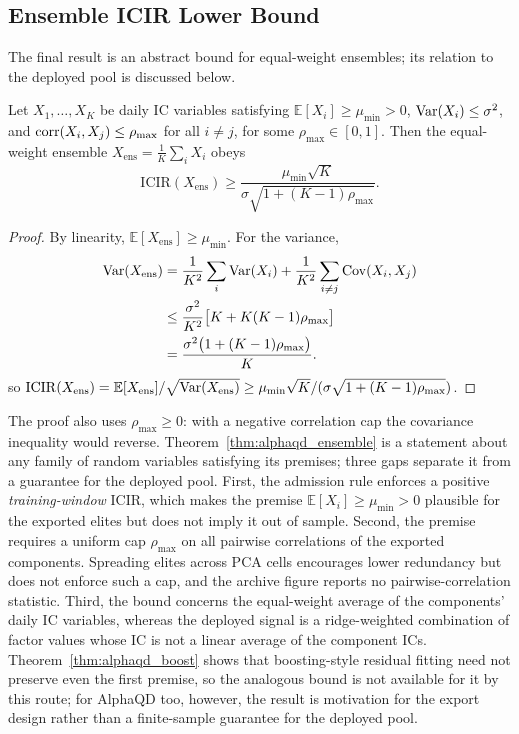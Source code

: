 \subsection{Ensemble ICIR Lower Bound}
\label{sec:alphaqd_ensemble}

The final result is an abstract bound for equal-weight ensembles; its relation to the deployed pool is discussed below.

\begin{theorem}
\label{thm:alphaqd_ensemble}
Let $X_1,\dots,X_K$ be daily IC variables satisfying $\mathbb{E}[X_i]\ge\mu_{\min}>0$, $\operatorname{Var}(X_i)\le\sigma^2$, and $\operatorname{corr}(X_i,X_j)\le\rho_{\max}$ for all $i\ne j$, for some $\rho_{\max}\in[0,1]$. Then the equal-weight ensemble $X_{\mathrm{ens}}=\frac{1}{K}\sum_i X_i$ obeys
\begin{equation}
\label{eq:alphaqd_ensemble}
\mathrm{ICIR}(X_{\mathrm{ens}}) \ge \frac{\mu_{\min}\sqrt{K}}{\sigma\sqrt{1+(K-1)\rho_{\max}}}.
\end{equation}
\end{theorem}
\begin{proof}
By linearity, $\mathbb{E}[X_{\mathrm{ens}}]\ge\mu_{\min}$. For the variance,
\begin{align*}
\operatorname{Var}(X_{\mathrm{ens}})
&=\frac{1}{K^2}\sum_i\operatorname{Var}(X_i)
  +\frac{1}{K^2}\sum_{i\ne j}\operatorname{Cov}(X_i,X_j)\\
&\le\frac{\sigma^2}{K^2}\bigl[K+K(K-1)\rho_{\max}\bigr]\\
&=\frac{\sigma^2\bigl(1+(K-1)\rho_{\max}\bigr)}{K}.
\end{align*}
so $\mathrm{ICIR}(X_{\mathrm{ens}})=\mathbb{E}[X_{\mathrm{ens}}]/\sqrt{\operatorname{Var}(X_{\mathrm{ens}})}\ge\mu_{\min}\sqrt{K}/(\sigma\sqrt{1+(K-1)\rho_{\max}})$.
\end{proof}

The proof also uses $\rho_{\max}\ge 0$: with a negative correlation cap the covariance inequality would reverse. Theorem~\ref{thm:alphaqd_ensemble} is a statement about any family of random variables satisfying its premises; three gaps separate it from a guarantee for the deployed pool. First, the admission rule enforces a positive \emph{training-window} ICIR, which makes the premise $\mathbb{E}[X_i]\ge\mu_{\min}>0$ plausible for the exported elites but does not imply it out of sample. Second, the premise requires a uniform cap $\rho_{\max}$ on all pairwise correlations of the exported components. Spreading elites across PCA cells encourages lower redundancy but does not enforce such a cap, and the archive figure reports no pairwise-correlation statistic. Third, the bound concerns the equal-weight average of the components' daily IC variables, whereas the deployed signal is a ridge-weighted combination of factor values whose IC is not a linear average of the component ICs. Theorem~\ref{thm:alphaqd_boost} shows that boosting-style residual fitting need not preserve even the first premise, so the analogous bound is not available for it by this route; for AlphaQD too, however, the result is motivation for the export design rather than a finite-sample guarantee for the deployed pool.

